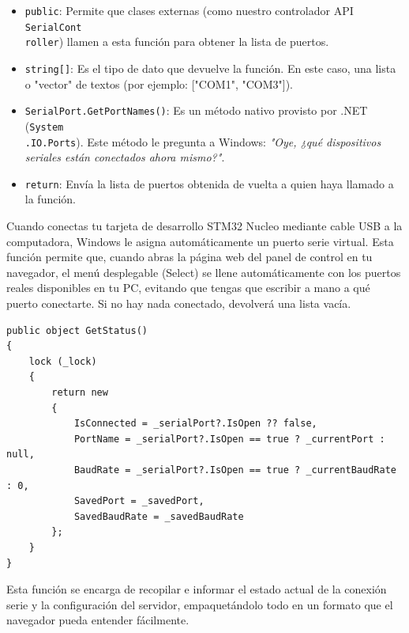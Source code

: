 \documentclass[
10pt, %
a4paper, %
oneside, %
headinclude,footinclude, %
BCOR5mm, %
]{scrartcl}
\begin{document}
\begin{itemize}
	\item \texttt{public}:  Permite que clases externas (como nuestro controlador API \texttt{SerialCont\\roller}) llamen a esta función para obtener la lista de puertos.
	\item \texttt{string[]}: Es el tipo de dato que devuelve la función. En este caso, una lista o "vector" de textos (por ejemplo: ["COM1", "COM3"]).
	\item \texttt{SerialPort.GetPortNames()}: Es un método nativo provisto por .NET (\texttt{System\\.IO.Ports}). Este método le pregunta a Windows: \textit{"Oye, ¿qué dispositivos seriales están conectados ahora mismo?"}.
	\item \texttt{return}: Envía la lista de puertos obtenida de vuelta a quien haya llamado a la función.
\end{itemize}

Cuando conectas tu tarjeta de desarrollo STM32 Nucleo mediante cable USB a la computadora, Windows le asigna automáticamente un puerto serie virtual. Esta función permite que, cuando abras la página web del panel de control en tu navegador, el menú desplegable (Select) se llene automáticamente con los puertos reales disponibles en tu PC, evitando que tengas que escribir a mano a qué puerto conectarte. Si no hay nada conectado, devolverá una lista vacía.

\begin{lstlisting}[style=VSCodeDark]
public object GetStatus()
{
	lock (_lock)
	{
		return new
		{
			IsConnected = _serialPort?.IsOpen ?? false,
			PortName = _serialPort?.IsOpen == true ? _currentPort : null,
			BaudRate = _serialPort?.IsOpen == true ? _currentBaudRate : 0,
			SavedPort = _savedPort,
			SavedBaudRate = _savedBaudRate
		};
	}
}
\end{lstlisting}


Esta función se encarga de recopilar e informar el estado actual de la conexión serie y la configuración del servidor, empaquetándolo todo en un formato que el navegador pueda entender fácilmente.
\end{document}
